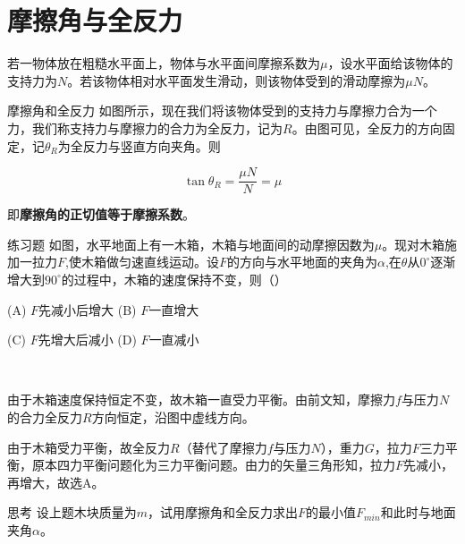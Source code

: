 \section{摩擦角与全反力}

若一物体放在粗糙水平面上，物体与水平面间摩擦系数为$\mu$，设水平面给该物体的支持力为$N$。若该物体相对水平面发生滑动，则该物体受到的滑动摩擦为$\mu N$。



\begin{defi}{摩擦角和全反力}{}
如图所示，现在我们将该物体受到的支持力与摩擦力合为一个力，我们称支持力与摩擦力的合力为全反力，记为$R$。由图可见，全反力的方向固定，记$\theta_R$为全反力与竖直方向夹角。则

$$\tan{\theta_R}  = \frac{\mu N}{N} = \mu$$

即\textbf{摩擦角的正切值等于摩擦系数}。
\end{defi}

\begin{ep}{练习题}{}
如图，水平地面上有一木箱，木箱与地面间的动摩擦因数为$\mu$。现对木箱施加一拉力$F$,使木箱做匀速直线运动。设$F$的方向与水平地面的夹角为$\alpha$,在$\theta$从$0^{\circ}$逐渐增大到$90^{\circ}$的过程中，木箱的速度保持不变，则（）


\begin{minipage}[b]{0.6\linewidth}
(A) $F$先减小后增大 \quad (B) $F$一直增大

(C) $F$先增大后减小 \quad (D) $F$一直减小
\end{minipage}
\hfill
\begin{minipage}[b]{0.3\linewidth}

\end{minipage}
~\\

\begin{minipage}[b]{0.6\linewidth}
由于木箱速度保持恒定不变，故木箱一直受力平衡。由前文知，摩擦力$f$与压力$N$的合力全反力$R$方向恒定，沿图中虚线方向。
\end{minipage}
\hfill
\begin{minipage}[b]{0.3\linewidth}

\end{minipage}

由于木箱受力平衡，故全反力$R$（替代了摩擦力$f$与压力$N$），重力$G$，拉力$F$三力平衡，原本四力平衡问题化为三力平衡问题。由力的矢量三角形知，拉力$F$先减小，再增大，故选A。
\end{ep}

\begin{mk}{思考}{}
设上题木块质量为$m$，试用摩擦角和全反力求出$F$的最小值$F_{min}$和此时与地面夹角$\alpha$。
\end{mk}

